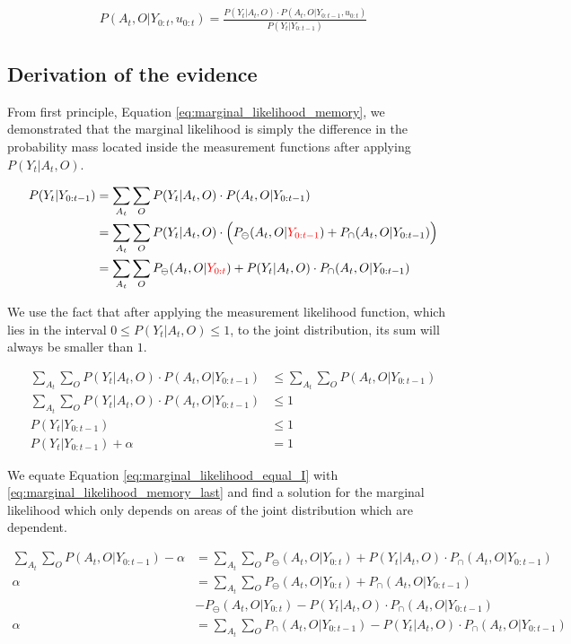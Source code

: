 \documentclass[review]{elsarticle}
\numberwithin{equation}{section}
\begin{document}
\begin{align}
 P(A_t,O|Y_{0:t},u_{0:t}) = \frac{P(Y_t|A_{t},O) \cdot P(A_{t},O|Y_{0:t-1},u_{0:t})}{P(Y_t|Y_{0:t-1})}
\end{align}


\subsection{Derivation of the evidence}\label{appendix:evidence}

From first principle, Equation \ref{eq:marginal_likelihood_memory}, we demonstrated that the marginal likelihood is simply the difference
in the probability mass located inside the measurement functions after applying $P(Y_t|A_t,O)$.

\begin{align} \label{eq:marginal_likelihood_memory}
 P(Y_t|Y_{0:t-1}) &= \sum\limits_{A_t}\sum\limits_{O} P(Y_t|A_t,O)\cdot P(A_t,O|Y_{0:t-1}) \\
		  &= \sum\limits_{A_t}\sum\limits_{O} P(Y_t|A_t,O)\cdot \Big(P_{\ominus}(A_t,O|{\color{red}Y_{0:t-1}}) + P_{\cap}(A_t,O|Y_{0:t-1})\Big)\\
		  &= \sum\limits_{A_t}\sum\limits_{O} P_{\ominus}(A_t,O|{\color{red}Y_{0:t}}) + P(Y_t|A_t,O)\cdot P_{\cap}(A_t,O|Y_{0:t-1}) \label{eq:marginal_likelihood_memory_last}
\end{align}

We use the fact that after applying the measurement likelihood function, which lies in the interval $0 \leq P(Y_t|A_t,O) \leq 1$, 
to the joint distribution, its sum will always be smaller than $1$.

\begin{align}
  \sum\limits_{A_t}\sum\limits_{O} P(Y_t|A_t,O) \cdot P(A_t,O|Y_{0:t-1})  &\leq \sum\limits_{A_t}\sum\limits_{O} P(A_t,O|Y_{0:t-1}) \\
  \sum\limits_{A_t}\sum\limits_{O} P(Y_t|A_t,O) \cdot P(A_t,O|Y_{0:t-1}) &\leq 1 \\
  P(Y_t|Y_{0:t-1}) &\leq 1 \\
  P(Y_t|Y_{0:t-1}) + \alpha &= 1 \label{eq:marginal_likelihood_equal_I}
\end{align}

We equate Equation \ref{eq:marginal_likelihood_equal_I} with \ref{eq:marginal_likelihood_memory_last} and find a solution for the marginal likelihood which
only depends on areas of the joint distribution which are dependent.
		   
\begin{align}		  
 \sum\limits_{A_t}\sum\limits_{O} P(A_t,O|Y_{0:t-1}) - \alpha  &= \sum\limits_{A_t}\sum\limits_{O} P_{\ominus}(A_t,O|Y_{0:t}) + P(Y_t|A_t,O)\cdot P_{\cap}(A_t,O|Y_{0:t-1}) \\
   \alpha &= \sum\limits_{A_t}\sum\limits_{O}  P_{\ominus}(A_t,O|Y_{0:t}) + P_{\cap}(A_t,O|Y_{0:t-1})\\
     & - P_{\ominus}(A_t,O|Y_{0:t}) - P(Y_t|A_t,O)\cdot P_{\cap}(A_t,O|Y_{0:t-1}) \\
    \alpha &= \sum\limits_{A_t}\sum\limits_{O} P_{\cap}(A_t,O|Y_{0:t-1}) - P(Y_t|A_t,O)\cdot P_{\cap}(A_t,O|Y_{0:t-1}) \label{eq:marginal_likelihood_equal_I2}
\end{align}
\end{document}

